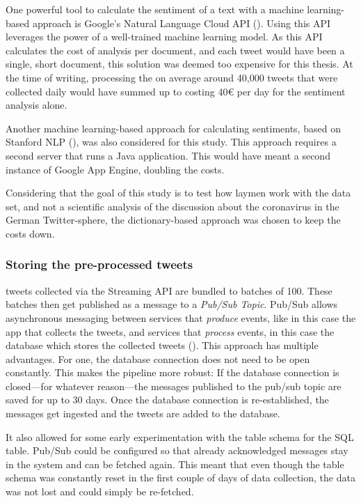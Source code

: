 One powerful tool to calculate the sentiment of a text with a machine learning-based approach is Google's Natural Language Cloud API (\cite{googleSentimentAnalysisTutorial2020}). Using this API leverages the power of a well-trained machine learning model. As this API calculates the cost of analysis per document, and each tweet would have been a single, short document, this solution was deemed too expensive for this thesis. At the time of writing, processing the on average around 40,000 tweets that were collected daily would have summed up to costing 40€ per day for the sentiment analysis alone.

Another machine learning-based approach for calculating sentiments, based on Stanford NLP (\cite{stanfordnlp-groupSoftwareStanfordNatural}), was also considered for this study. This approach requires a second server that runs a Java application. This would have meant a second instance of Google App Engine, doubling the costs.

Considering that the goal of this study is to test how laymen work with the data set, and not a scientific analysis of the discussion about the coronavirus in the German Twitter-sphere, the dictionary-based approach was chosen to keep the costs down.

\subsubsection{Storing the pre-processed tweets}\label{sec:storage}
tweets collected via the Streaming API are bundled to batches of 100. These batches then get published as a message to a \emph{Pub/Sub Topic}. Pub/Sub allows asynchronous messaging between services that \emph{produce} events, like in this case the app that collects the tweets, and services that \emph{process} events, in this case the database which stores the collected tweets (\cite{googleWhatPubSub2020}).
This approach has multiple advantages. For one, the database connection does not need to be open constantly. This makes the pipeline more robust: If the database connection is closed---for whatever reason---the messages published to the pub/sub topic are saved for up to 30 days. Once the database connection is re-established, the messages get ingested and the tweets are added to the database.

It also allowed for some early experimentation with the table schema for the SQL table. Pub/Sub could be configured so that already acknowledged messages stay in the system and can be fetched again. This meant that even though the table schema was constantly reset in the first couple of days of data collection, the data was not lost and could simply be re-fetched.

